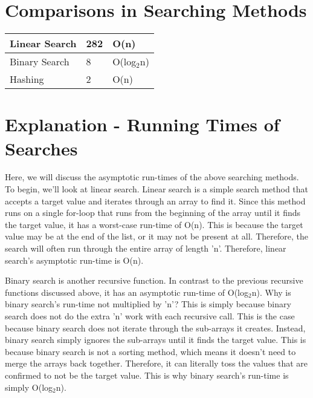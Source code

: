 \documentclass[letterpaper, 10pt]{article}
\begin{document}
\section{Comparisons in Searching Methods}\par
\begin{tabu} to 0.8\textwidth { | X[l] | X[c] | X[r] | }
\hline
 Linear Search & 282 & O(n)\\
\hline
 Binary Search & 8 & O(log$_{2}$n) \\
\hline
 Hashing & 2 & O(n) \\
\hline
\end{tabu}

\section{Explanation - Running Times of Searches}\par
Here, we will discuss the asymptotic run-times of the above searching methods. To begin, we'll look at linear search. Linear search is a simple search method that accepts a target value and iterates through an array to find it. Since this method runs on a single for-loop that runs from the beginning of the array until it finds the target value, it has a worst-case run-time of O(n). This is because the target value may be at the end of the list, or it may not be present at all. Therefore, the search will often run through the entire array of length 'n'. Therefore, linear search's asymptotic run-time is O(n).\par
Binary search is another recursive function. In contrast to the previous recursive functions discussed above, it has an asymptotic run-time of O(log$_{2}$n). Why is binary search's run-time not multiplied by 'n'? This is simply because binary search does not do the extra 'n' work with each recursive call. This is the case because binary search does not iterate through the sub-arrays it creates. Instead, binary search simply ignores the sub-arrays until it finds the target value. This is because binary search is not a sorting method, which means it doesn't need to merge the arrays back together. Therefore, it can literally toss the values that are confirmed to not be the target value. This is why binary search's run-time is simply O(log$_{2}$n).\par
\end{document}
